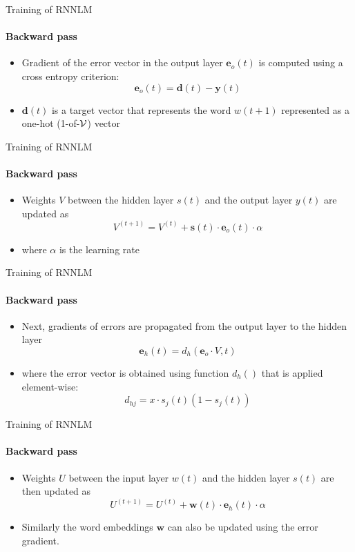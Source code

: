 \begin{frame}{Training of RNNLM}
\framesubtitle{Backward pass}
\begin{itemize}[<+->]
	\item Gradient of the error vector in the output layer $\mathbf{e}_o(t)$ is computed using a cross entropy criterion:
	\[ \mathbf{e}_o(t) = \mathbf{d}(t) - \mathbf{y}(t) \]
	\item $\mathbf{d}(t)$ is a target vector that represents the word $w(t+1)$ represented as a one-hot (1-of-${\cal V}$) vector
\end{itemize}
\end{frame}

\begin{frame}{Training of RNNLM}
\framesubtitle{Backward pass}
\begin{itemize}[<+->]
	\item Weights $V$ between the hidden layer $s(t)$ and the output layer $y(t)$ are updated as
	\[ V^{(t+1)} = V^{(t)} + \mathbf{s}(t) \cdot \mathbf{e}_o(t) \cdot \alpha \]
	\item where $\alpha$ is the learning rate
\end{itemize}
\end{frame}

\begin{frame}{Training of RNNLM}
\framesubtitle{Backward pass}
\begin{itemize}[<+->]
	\item Next, gradients of errors are propagated from the output layer to the hidden layer
	\[ \mathbf{e}_h(t) = d_h(\mathbf{e}_o \cdot V, t) \]
	\item where the error vector is obtained using function $d_h()$ that is applied element-wise:
	\[ d_{hj} = x \cdot s_j(t) (1 - s_j(t))\]
\end{itemize}
\end{frame}

\begin{frame}{Training of RNNLM}
\framesubtitle{Backward pass}
\begin{itemize}[<+->]
	\item Weights $U$ between the input layer $w(t)$ and the hidden layer $s(t)$ are then updated as
	\[ U^{(t+1)} = U^{(t)} + \mathbf{w}(t) \cdot \mathbf{e}_h(t) \cdot \alpha \]
	\item Similarly the word embeddings $\mathbf{w}$ can also be updated using the error gradient.
\end{itemize}
\end{frame}


